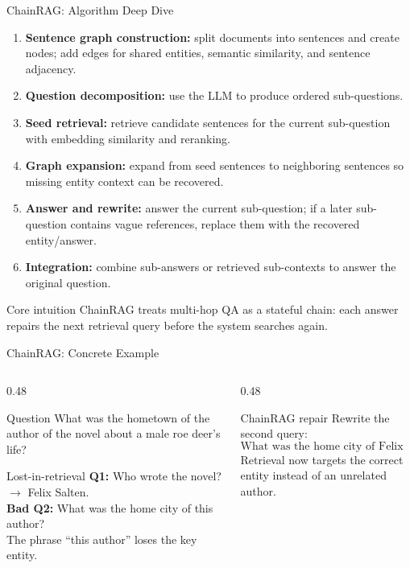 
\begin{frame}{ChainRAG: Algorithm Deep Dive}
\scriptsize
\begin{enumerate}
  \item \textbf{Sentence graph construction:} split documents into sentences and create nodes; add edges for shared entities, semantic similarity, and sentence adjacency.
  \item \textbf{Question decomposition:} use the LLM to produce ordered sub-questions.
  \item \textbf{Seed retrieval:} retrieve candidate sentences for the current sub-question with embedding similarity and reranking.
  \item \textbf{Graph expansion:} expand from seed sentences to neighboring sentences so missing entity context can be recovered.
  \item \textbf{Answer and rewrite:} answer the current sub-question; if a later sub-question contains vague references, replace them with the recovered entity/answer.
  \item \textbf{Integration:} combine sub-answers or retrieved sub-contexts to answer the original question.
\end{enumerate}
\begin{block}{Core intuition}
ChainRAG treats multi-hop QA as a stateful chain: each answer repairs the next retrieval query before the system searches again.
\end{block}
\end{frame}

\begin{frame}{ChainRAG: Concrete Example}
\scriptsize
\begin{columns}[T,onlytextwidth]
  \begin{column}{0.48\textwidth}
    \begin{block}{Question}
      What was the hometown of the author of the novel about a male roe deer's life?
    \end{block}
    \begin{block}{Lost-in-retrieval}
      \textbf{Q1:} Who wrote the novel? $\rightarrow$ Felix Salten.\\
      \textbf{Bad Q2:} What was the home city of this author?\\
      The phrase ``this author'' loses the key entity.
    \end{block}
  \end{column}
  \begin{column}{0.48\textwidth}
    \begin{block}{ChainRAG repair}
      Rewrite the second query:
      \[
      \text{What was the home city of Felix Salten?}
      \]
      Retrieval now targets the correct entity instead of an unrelated author.
    \end{block}
  \end{column}
\end{columns}
\end{frame}

